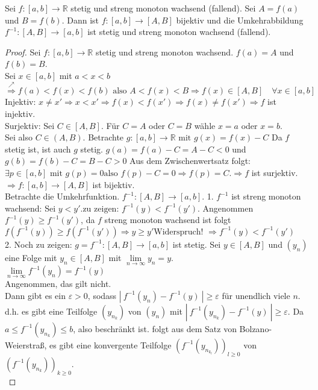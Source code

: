 \documentclass[a4paper,titlepage,oneside]{article}
\def\R{\ensuremath{\mathbb{R}} }
\renewcommand{\epsilon}{\ensuremath{\varepsilon} }
\def\WSP{\text{Widerspruch! }}
\def\zz{\text{zu zeigen: }}
\renewcommand{\liminf}[2][n]{\ensuremath{\lim\limits_{#1 \rightarrow \infty}{#2}}}
\newcommand{\abs}[1]{\ensuremath{\left|\:#1\:\right|}}
\theoremstyle{thmstyle}
\begin{document}
\begin{satz}
Sei $f: [a,b] \to \R$ stetig und streng monoton wachsend (fallend). Sei $ A= f(a)$ und $ B = f(b)$.
Dann ist $f: [a,b] \to [A,B]$ bijektiv und die Umkehrabbildung $f^{-1} : [A,B] \to [a,b]$ ist stetig und streng monoton wachsend (fallend).
\begin{proof}
Sei $f: [a,b] \to \R$ stetig und streng monoton wachsend. $f(a) = A$ und $f(b) = B$.\\
Sei $x \in[a,b]$ mit $a < x < b$\\
$\overset{\nearrow}{\Rightarrow} f(a) < f(x) < f(b) \text{ also } A < f(x) < B \Rightarrow f(x) \in [A,B] \quad \forall x \in[a,b]$\\
Injektiv: $x \ne x' \Rightarrow x < x' \Rightarrow f(x) < f(x') \Rightarrow f(x) \ne f(x') \Rightarrow f$ ist injektiv.\\
Surjektiv: Sei $ C \in [A,B]$. Für $C = A $ oder $C = B$ wähle $ x = a$ oder $x = b$.\\
Sei also $C \in (A,B)$. Betrachte $g: [a,b] \to \R \text{ mit } g(x) = f(x)-C$ Da $f$ stetig ist, ist auch $g$ stetig. $g(a) = f(a) -C = A- C < 0$ und $g(b) = f(b) -C = B - C > 0$ Aus dem Zwischenwertsatz folgt: $\exists p \in [a,b]\text{ mit }g(p) = 0\text{also } f(p) - C = 0 \Rightarrow f(p) = C. \Rightarrow f$ ist surjektiv.\\
$\Rightarrow  f: [a,b] \to [A,B] $ ist bijektiv.\\
Betrachte die Umkehrfunktion. $f^{-1} : [A,B] \to [a,b]$.
1. $f^{-1}$  ist streng monoton wachsend:
Sei $y < y'. \zz f^{-1}(y) < f^{-1}(y')$.
Angenommen $f^{-1}(y) \ge f^{-1}(y')$, da $f$ streng monoton wachsend ist folgt $f(f^{-1}(y)) \ge f(f^{-1}(y')) \Rightarrow y \ge y' \WSP \Rightarrow f^{-1}(y) < f^{-1}(y')$\\
2. Noch zu zeigen: $g = f^{-1}: [A,B] \to [a,b]$ ist stetig.
Sei $y \in [A,B]$ und $(y_n)$ eine Folge mit $y_n \in[A,B]$ mit $\liminf{y_n} = y$.\\
\zz $\liminf{f^{-1}(y_n)} = f^{-1}(y)$\\
Angenommen, das gilt nicht.\\
Dann gibt es ein $\epsilon > 0$, sodass $\abs{f^{-1}(y_n) - f^{-1}(y)} \ge \epsilon$ für unendlich viele $n$. d.h. es gibt eine Teilfolge $(y_{n_k})$ von $(y_n)$ mit $\abs{f^{-1}(y_{n_k}) - f^{-1}(y)} \ge \epsilon.$ Da $a \le f^{-1}(y_{n_k}) \le b$, also beschränkt ist. folgt aus dem Satz von Bolzano-Weierstraß, es gibt eine konvergente Teilfolge $(f^{-1}(y_{n_{k_l}}))_{l \ge 0}$ von $(f^{-1}(y_{n_k}))_{k \ge 0}$.\\

\end{proof}
\end{satz}
\end{document}
